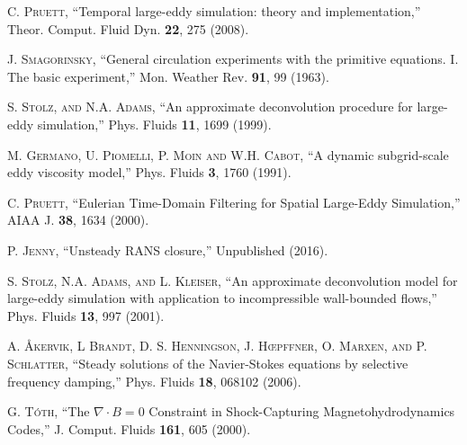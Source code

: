 


\begin{thebibliography}{99}

 \textsc {C. Pruett,}  ``Temporal large-eddy simulation: theory and implementation,'' Theor. Comput. Fluid Dyn. \textbf{22}, 275 (2008).

 \textsc {J. Smagorinsky,} ``General circulation experiments with the primitive equations. I. The basic experiment,'' Mon. Weather Rev. \textbf{91}, 99 (1963).

 \textsc {S. Stolz, and N.A. Adams,}  ``An approximate deconvolution procedure for large-eddy simulation,'' Phys. Fluids  \textbf{11}, 1699 (1999).

 \textsc {M. Germano, U. Piomelli, P. Moin and W.H. Cabot,} ``A dynamic subgrid-scale eddy viscosity model,'' Phys. Fluids \textbf{3}, 1760 (1991).

 \textsc {C. Pruett,}  ``Eulerian Time-Domain Filtering for Spatial Large-Eddy Simulation,'' AIAA J. \textbf{38}, 1634 (2000).

 \textsc {P. Jenny,}  ``Unsteady RANS closure,'' Unpublished (2016).

 \textsc {S. Stolz, N.A. Adams, and L. Kleiser,}  ``An approximate deconvolution model for large-eddy simulation with application to incompressible wall-bounded flows,'' Phys. Fluids  \textbf{13}, 997 (2001).

 \textsc {A. \AA kervik, L Brandt, D. S. Henningson, J. H\oe pffner, O. Marxen, and P. Schlatter,}  ``Steady solutions of the Navier-Stokes equations by selective frequency damping,'' Phys. Fluids  \textbf{18}, 068102 (2006).

 \textsc {G. T\'oth,}  ``The $\nabla \cdot B=0$ Constraint in Shock-Capturing Magnetohydrodynamics Codes,'' J. Comput. Fluids \textbf{161}, 605 (2000).

 
\end{thebibliography}
